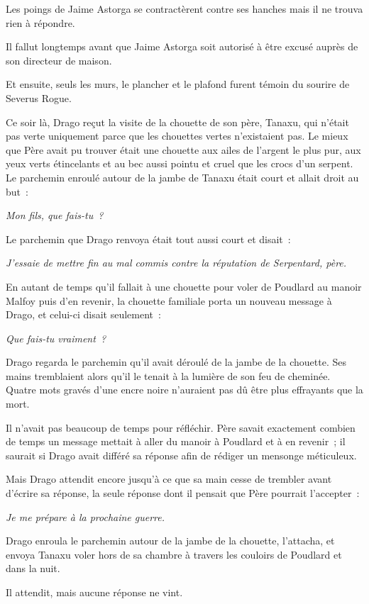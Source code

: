 Les poings de Jaime Astorga se contractèrent contre ses hanches mais il ne trouva rien à répondre.

Il fallut longtemps avant que Jaime Astorga soit autorisé à être excusé auprès de son directeur de maison.

Et ensuite, seuls les murs, le plancher et le plafond furent témoin du sourire de Severus Rogue.

\later

Ce soir là, Drago reçut la visite de la chouette de son père, Tanaxu, qui n'était pas verte uniquement parce que les chouettes vertes n'existaient pas. Le mieux que Père avait pu trouver était une chouette aux ailes de l'argent le plus pur, aux yeux verts étincelants et au bec aussi pointu et cruel que les crocs d'un serpent. Le parchemin enroulé autour de la jambe de Tanaxu était court et allait droit au but~:

\emph{Mon fils, que fais-tu~?}

Le parchemin que Drago renvoya était tout aussi court et disait~:

\emph{J'essaie de mettre fin au mal commis contre la réputation de Serpentard, père.}

En autant de temps qu'il fallait à une chouette pour voler de Poudlard au manoir Malfoy puis d'en revenir, la chouette familiale porta un nouveau message à Drago, et celui-ci disait seulement~:

\emph{Que fais-tu vraiment~?}

Drago regarda le parchemin qu'il avait déroulé de la jambe de la chouette. Ses mains tremblaient alors qu'il le tenait à la lumière de son feu de cheminée. Quatre mots gravés d'une encre noire n'auraient pas dû être plus effrayants que la mort.

Il n'avait pas beaucoup de temps pour réfléchir. Père savait exactement combien de temps un message mettait à aller du manoir à Poudlard et à en revenir~; il saurait si Drago avait différé sa réponse afin de rédiger un mensonge méticuleux.

Mais Drago attendit encore jusqu'à ce que sa main cesse de trembler avant d'écrire sa réponse, la seule réponse dont il pensait que Père pourrait l'accepter~:

\emph{Je me prépare à la prochaine guerre.}

Drago enroula le parchemin autour de la jambe de la chouette, l'attacha, et envoya Tanaxu voler hors de sa chambre à travers les couloirs de Poudlard et dans la nuit.

Il attendit, mais aucune réponse ne vint.


